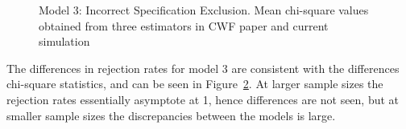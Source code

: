 \documentclass[
  letterpaper,
  DIV=11,
  numbers=noendperiod]{scrartcl}
\begin{document}
\begin{figure}[H]


\caption{\label{fig-plot_chi_3}Model 3: Incorrect Specification
Exclusion. Mean chi-square values obtained from three estimators in CWF
paper and current simulation}

\end{figure}%

The differences in rejection rates for model 3 are consistent with the
differences chi-square statistics, and can be seen in
Figure~\ref{fig-plot_rejects_3}. At larger sample sizes the rejection
rates essentially asymptote at 1, hence differences are not seen, but at
smaller sample sizes the discrepancies between the models is large.

\begin{figure}[H]


\caption{\label{fig-plot_rejects_3}}

\end{figure}%
\end{document}
